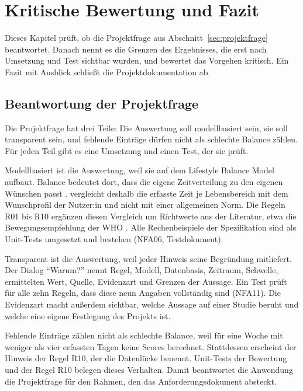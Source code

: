 \section{Kritische Bewertung und Fazit}\label{sec:fazit}
Dieses Kapitel prüft, ob \Projektname{} die Projektfrage aus Abschnitt~\ref{sec:projektfrage} beantwortet. Danach nennt es die Grenzen des Ergebnisses, die erst nach Umsetzung und Test sichtbar wurden, und bewertet das Vorgehen kritisch. Ein Fazit mit Ausblick schließt die Projektdokumentation ab.

\subsection{Beantwortung der Projektfrage}
Die Projektfrage hat drei Teile: Die Auswertung soll modellbasiert sein, sie soll transparent sein, und fehlende Einträge dürfen nicht als schlechte Balance zählen. Für jeden Teil gibt es eine Umsetzung und einen Test, der sie prüft.

Modellbasiert ist die Auswertung, weil sie auf dem Lifestyle Balance Model aufbaut. Balance bedeutet dort, dass die eigene Zeitverteilung zu den eigenen Wünschen passt \parencite[S.~11]{matuska2008}. \Projektname{} vergleicht deshalb die erfasste Zeit je Lebensbereich mit dem Wunschprofil der Nutzer:in und nicht mit einer allgemeinen Norm. Die Regeln R01 bis R10 ergänzen diesen Vergleich um Richtwerte aus der Literatur, etwa die Bewegungsempfehlung der \ac{WHO} \parencite[S.~1451]{bull2020}. Alle Rechenbeispiele der Spezifikation sind als Unit-Tests umgesetzt und bestehen (NFA06, Testdokument).

Transparent ist die Auswertung, weil jeder Hinweis seine Begründung mitliefert. Der Dialog \enquote{Warum?} nennt Regel, Modell, Datenbasis, Zeitraum, Schwelle, ermittelten Wert, Quelle, Evidenzart und Grenzen der Aussage. Ein Test prüft für alle zehn Regeln, dass diese neun Angaben vollständig sind (NFA11). Die Evidenzart macht außerdem sichtbar, welche Aussage auf einer Studie beruht und welche eine eigene Festlegung des Projekts ist.

Fehlende Einträge zählen nicht als schlechte Balance, weil \Projektname{} für eine Woche mit weniger als vier erfassten Tagen keine Scores berechnet. Stattdessen erscheint der Hinweis der Regel R10, der die Datenlücke benennt. Unit-Tests der Bewertung und der Regel R10 belegen dieses Verhalten. Damit beantwortet die Anwendung die Projektfrage für den Rahmen, den das Anforderungsdokument absteckt.

